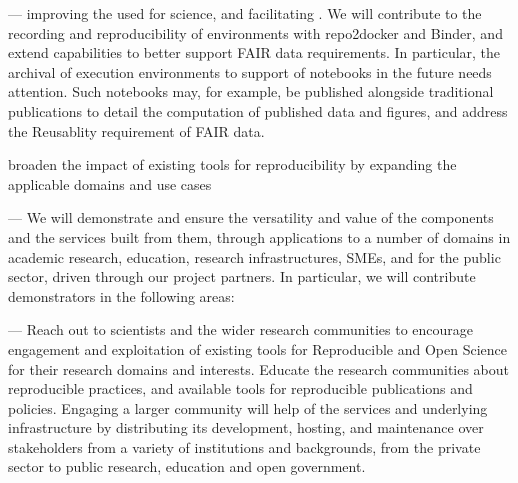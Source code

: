 \begin{compactenum}

\item \label{obj:reproducibility}  ---
  improving the 
  used for science, and facilitating .
  We will contribute to the recording and reproducibility
  of environments with repo2docker and Binder,
  and extend capabilities to better support FAIR
  data requirements. In particular, the archival of execution
  environments to support  of notebooks in the future
  needs attention. Such notebooks may, for example, be published alongside
  traditional publications to detail the computation of published data
  and figures, and address the Reusablity requirement of FAIR data.

\item \label{obj:broaden} broaden the impact of existing tools for reproducibility by expanding the applicable domains and use cases
\item \label{obj:demonstrators}
   ---
  We will demonstrate and ensure the versatility and value of the components and
  the services built from them,
  through applications to a number of
  domains in academic research, education, research infrastructures, SMEs, and for
  the public sector, driven through our project partners. In
  particular, we will contribute demonstrators in the following areas:

\item \label{obj:education}
   ---
  Reach out to scientists and the wider research
  communities to encourage engagement
  and exploitation of existing tools for Reproducible and Open Science
  for their research domains and interests.
  Educate the research communities about reproducible practices,
  and available tools for reproducible publications and policies.
  Engaging a larger community will help  of
  the services and underlying infrastructure by distributing its
  development, hosting, and maintenance over stakeholders from a
  variety of institutions and backgrounds,
  from the private sector to public research, education
  and open government.



\end{compactenum}

